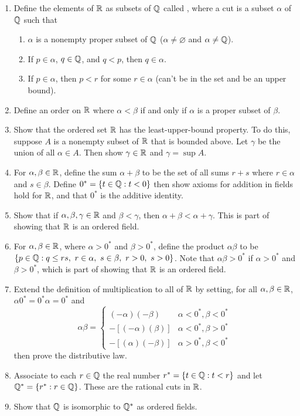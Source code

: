 \documentclass{mathnotes}
\begin{document}
\begin{enumerate}
  \item Define the elements of $\mathbb{R}$ as subsets of $\mathbb{Q}$ called ,
    where a cut is a subset $\alpha$ of $\mathbb{Q}$ such that
    \begin{enumerate}
      \item $\alpha$ is a nonempty proper subset of $\mathbb{Q}$ ($\alpha\ne\varnothing$
        and $\alpha\ne\mathbb{Q}$).
      \item If $p\in\alpha$, $q\in\mathbb{Q}$, and $q<p$, then $q\in\alpha$.
      \item If $p\in\alpha$, then $p<r$ for some $r\in\alpha$ (can't be in the
        set and be an upper bound).
    \end{enumerate}
  \item Define an order on $\mathbb{R}$ where $\alpha<\beta$ if and only if $\alpha$
    is a proper subset of $\beta$.
  \item Show that the ordered set $\mathbb{R}$ has the least-upper-bound property. To
    do this, suppose $A$ is a nonempty subset of $\mathbb{R}$ that is bounded above.
    Let $\gamma$ be the union of all $\alpha\in A$. Then show $\gamma\in\mathbb{R}$
    and $\gamma=\sup A$.
  \item For $\alpha,\beta\in\mathbb{R}$, define the sum $\alpha+\beta$ to be the set
    of all sums $r+s$ where $r\in\alpha$ and $s\in\beta$. Define
    $0^*=\{t\in\mathbb{Q}:t<0\}$ then show axioms for addition in fields hold for
    $\mathbb{R}$, and that $0^*$ is the additive identity.
  \item Show that if $\alpha,\beta,\gamma\in\mathbb{R}$ and $\beta<\gamma$, then
    $\alpha+\beta<\alpha+\gamma$. This is part of showing that $\mathbb{R}$ is an
    ordered field.
  \item For $\alpha,\beta\in\mathbb{R}$, where $\alpha>0^*$ and $\beta>0^*$, define
    the product $\alpha\beta$ to be $\{p\in\mathbb{Q}:q\le rs,\ r\in\alpha,\
    s\in\beta,\ r>0,\ s>0\}$. Note that $\alpha\beta>0^*$ if $\alpha>0^*$ and
    $\beta>0^*$, which is part of showing that $\mathbb{R}$ is an ordered field.
  \item Extend the definition of multiplication to all of $\mathbb{R}$ by setting, for
    all $\alpha,\beta\in\mathbb{R}$, $\alpha0^*=0^*\alpha=0^*$ and
    $$\alpha\beta=\begin{cases}
      (-\alpha)(-\beta) & \alpha<0^*, \beta<0^*\\
      -[(-\alpha)(\beta)] & \alpha<0^*, \beta>0^*\\
      -[(\alpha)(-\beta)] & \alpha>0^*, \beta<0^*
    \end{cases}$$
    then prove the distributive law.
  \item Associate to each $r\in\mathbb{Q}$ the real number $r^*=\{t\in\mathbb{Q}:t<r\}$ and
    let $\mathbb{Q}^*=\{r^*:r\in\mathbb{Q}\}$. These are the rational cuts in $\mathbb{R}$.
  \item Show that $\mathbb{Q}$ is isomorphic to $\mathbb{Q}^*$ as ordered fields.
\end{enumerate}
\end{document}
